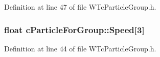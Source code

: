 Definition at line 47 of file WTcParticleGroup.h.

\hypertarget{classc_particle_for_group_a770a82116f2cfa3662573f1a13e3c3e1}{
\subsubsection[{Speed}]{\setlength{\rightskip}{0pt plus 5cm}float {\bf cParticleForGroup::Speed}\mbox{[}3\mbox{]}}}
\label{classc_particle_for_group_a770a82116f2cfa3662573f1a13e3c3e1}


Definition at line 44 of file WTcParticleGroup.h.

